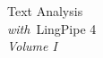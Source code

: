 \clearpage
\pagestyle{empty}
\cleardoublepage
\vspace*{1.75in}
\begin{center}
{\hfill \Huge Text Analysis \\[4pt] \hfill {\LARGE\it with}\ LingPipe 4 \\[18pt] \hfill {\large\it Volume I}}
\end{center}
